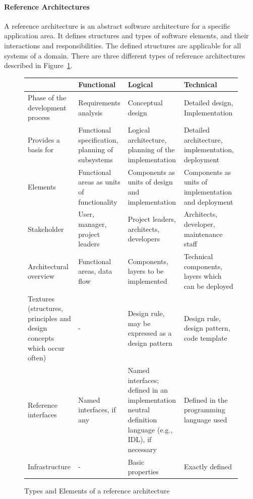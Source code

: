 \paragraph{Reference Architectures}
A reference architecture is an abstract software architecture for a specific application area. It defines structures and types of software elements, and their interactions and responsibilities. The defined structures are applicable for all systems of a domain.
There are three different types of reference architectures described in Figure~\ref{fig:reference_architectures}.
\begin{figure}[H]
  \centering
  \begin{tabular}{|p{}|p{}|p{}|p{}|}
    \hline
    & Functional & Logical & Technical\\
    \hline
    Phase of the development process & Requirements analysis & Conceptual design & Detailed design, Implementation\\
    \hline
    Provides a basis for & Functional specification, planning of subsystems & Logical architecture, planning of the implementation & Detailed architecture, implementation, deployment\\
    \hline
    Elements & Functional areas as units of functionality & Components as units of design and implementation & Components as units of implementation and deployment\\
    \hline
    Stakeholder & User, manager, project leaders & Project leaders, architects, developers & Architects, developer, maintenance staff\\
    \hline
    Architectural overview & Functional areas, data flow & Components, layers to be implemented & Technical components, layers which can be deployed\\
    \hline
    Textures (structures, principles and design concepts which occur often) & - & Design rule, may be expressed as a design pattern & Design rule, design pattern, code template\\
    \hline
    Reference interfaces & Named interfaces, if any & Named interfaces; defined in an implementation neutral definition language (e.g., IDL), if necessary & Defined in the programming language used\\
    \hline
    Infrastructure & - & Basic properties & Exactly defined\\
    \hline
  \end{tabular}
  \caption{Types and Elements of a reference architecture}\label{fig:reference_architectures}
\end{figure}

